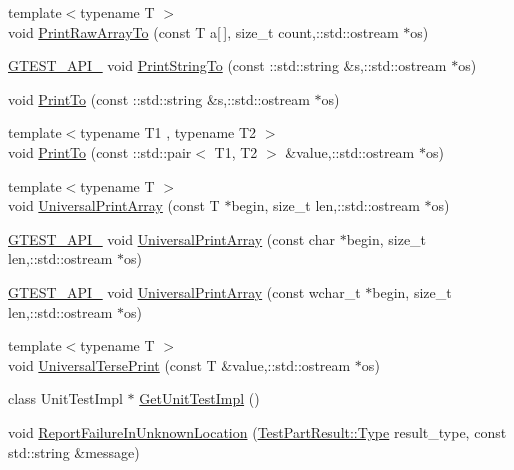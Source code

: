 \begin{DoxyCompactItemize}
\item 
{\footnotesize template$<$typename T $>$ }\\void \hyperlink{namespacetesting_1_1internal_aba630c2fa49dd2b4bce3de24e70aec9f}{Print\+Raw\+Array\+To} (const T a\mbox{[}$\,$\mbox{]}, size\+\_\+t count,\+::std\+::ostream $\ast$os)
\item 
\hyperlink{gtest-port_8h_aa73be6f0ba4a7456180a94904ce17790}{G\+T\+E\+S\+T\+\_\+\+A\+P\+I\+\_\+} void \hyperlink{namespacetesting_1_1internal_a0b11505e1a4527c1f1d8c1c5cdfb71b5}{Print\+String\+To} (const \+::std\+::string \&s,\+::std\+::ostream $\ast$os)
\item 
void \hyperlink{namespacetesting_1_1internal_a1bcff7765fb78cedada8d09f7159ab7e}{Print\+To} (const \+::std\+::string \&s,\+::std\+::ostream $\ast$os)
\item 
{\footnotesize template$<$typename T1 , typename T2 $>$ }\\void \hyperlink{namespacetesting_1_1internal_a5759c5abed8ebab0e1a8a0f8aadab768}{Print\+To} (const \+::std\+::pair$<$ T1, T2 $>$ \&value,\+::std\+::ostream $\ast$os)
\item 
{\footnotesize template$<$typename T $>$ }\\void \hyperlink{namespacetesting_1_1internal_a73b5046a2ed65d0e2fb7cdc9bdaee3fe}{Universal\+Print\+Array} (const T $\ast$begin, size\+\_\+t len,\+::std\+::ostream $\ast$os)
\item 
\hyperlink{gtest-port_8h_aa73be6f0ba4a7456180a94904ce17790}{G\+T\+E\+S\+T\+\_\+\+A\+P\+I\+\_\+} void \hyperlink{namespacetesting_1_1internal_a3fac293aeb6e7e6b3ff3e27404f6588b}{Universal\+Print\+Array} (const char $\ast$begin, size\+\_\+t len,\+::std\+::ostream $\ast$os)
\item 
\hyperlink{gtest-port_8h_aa73be6f0ba4a7456180a94904ce17790}{G\+T\+E\+S\+T\+\_\+\+A\+P\+I\+\_\+} void \hyperlink{namespacetesting_1_1internal_ae95ea0aea80977c0870df98b27a17cac}{Universal\+Print\+Array} (const wchar\+\_\+t $\ast$begin, size\+\_\+t len,\+::std\+::ostream $\ast$os)
\item 
{\footnotesize template$<$typename T $>$ }\\void \hyperlink{namespacetesting_1_1internal_ab3d834fb6c31d29e36400cc19905294b}{Universal\+Terse\+Print} (const T \&value,\+::std\+::ostream $\ast$os)
\item 
class Unit\+Test\+Impl $\ast$ \hyperlink{namespacetesting_1_1internal_a6211ab15f810f84dd40f111f5b4c9b32}{Get\+Unit\+Test\+Impl} ()
\item 
void \hyperlink{namespacetesting_1_1internal_a85f6ff0e40f9a5f10af66a73cf1364fa}{Report\+Failure\+In\+Unknown\+Location} (\hyperlink{classtesting_1_1_test_part_result_a65ae656b33fdfdfffaf34858778a52d5}{Test\+Part\+Result\+::\+Type} result\+\_\+type, const std\+::string \&message)

\end{DoxyCompactItemize}
